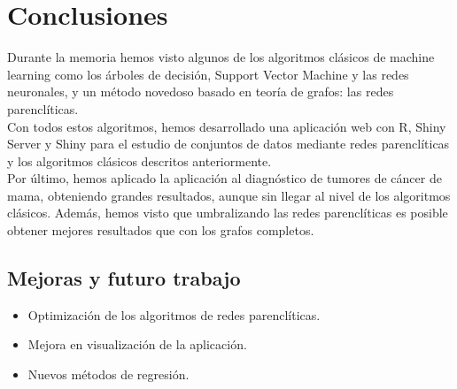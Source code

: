 \chapter{Conclusiones}
Durante la memoria hemos visto algunos de los algoritmos clásicos de machine learning como los árboles de decisión, Support  Vector Machine y las redes neuronales, y un método novedoso basado en teoría de grafos: las redes parenclíticas.\\

Con todos estos algoritmos, hemos desarrollado una aplicación web con R, Shiny Server y Shiny para el estudio de conjuntos de datos mediante redes parenclíticas y los algoritmos clásicos descritos anteriormente.\\

Por último, hemos aplicado la aplicación al diagnóstico de tumores de cáncer de mama, obteniendo grandes resultados, aunque sin llegar al nivel de los algoritmos clásicos. Además, hemos visto que umbralizando las redes parenclíticas es posible obtener mejores resultados que con los grafos completos.
   
\section{Mejoras y futuro trabajo}

\begin{itemize}
	\item Optimización de los algoritmos de redes parenclíticas.
	\item Mejora en visualización de la aplicación.
	\item Nuevos métodos de regresión.
\end{itemize}